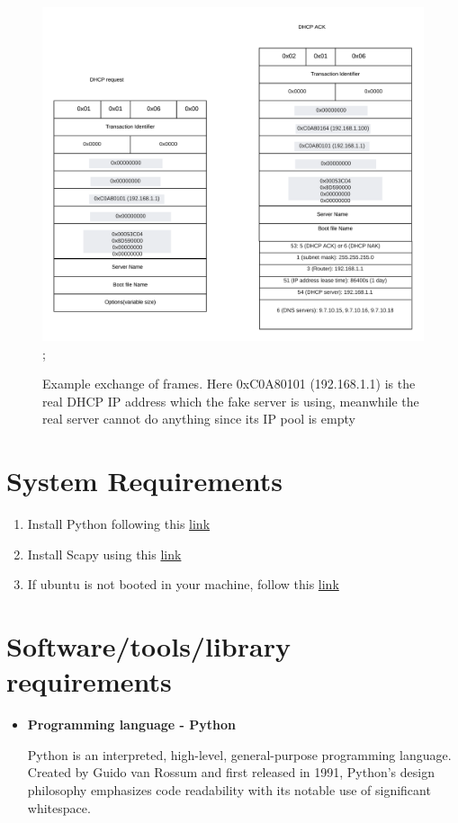 \documentclass[12pt]{article}
\begin{document}
\begin{sloppypar}
\begin{figure}[!h]
	\includegraphics[width=.70\textwidth]{images/packet2.png};
	\caption{Example exchange of frames. Here 0xC0A80101 (192.168.1.1) is the real DHCP IP address which the fake server is using, meanwhile the real server cannot do anything since its IP pool is empty}
\end{figure}
%


\newpage
\section{System Requirements}

\begin{enumerate}
	\item  Install Python following this	\href{http://ubuntuhandbook.org/index.php/2017/07/install-python-3-6-1-in-ubuntu-16-04-lts/}{link}
	
	\item Install Scapy using this \href{https://zoomadmin.com/HowToInstall/UbuntuPackage/scapy}{link}
	
	\item If ubuntu is not booted in your machine, follow this \href{https://itsfoss.com/install-ubuntu-dual-boot-mode-windows/}{link}
	
\end{enumerate}


\newpage
\section{Software/tools/library requirements}

\begin{itemize}
	\item \textbf{Programming language - Python}
	
	
	Python is an interpreted, high-level, general-purpose programming language. Created by Guido van Rossum and first released in 1991, Python's design philosophy emphasizes code readability with its notable use of significant whitespace. 
	

\end{itemize}
\end{sloppypar}
\end{document}
